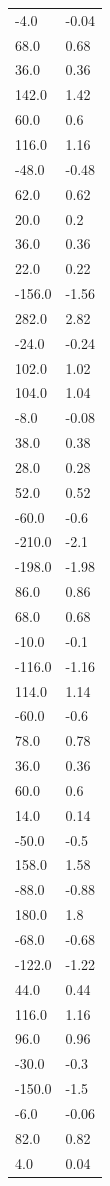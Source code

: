 \begin{longtable}{ll}
-4.0 & -0.04 \\
68.0 & 0.68 \\
36.0 & 0.36 \\
142.0 & 1.42 \\
60.0 & 0.6 \\
116.0 & 1.16 \\
-48.0 & -0.48 \\
62.0 & 0.62 \\
20.0 & 0.2 \\
36.0 & 0.36 \\
22.0 & 0.22 \\
-156.0 & -1.56 \\
282.0 & 2.82 \\
-24.0 & -0.24 \\
102.0 & 1.02 \\
104.0 & 1.04 \\
-8.0 & -0.08 \\
38.0 & 0.38 \\
28.0 & 0.28 \\
52.0 & 0.52 \\
-60.0 & -0.6 \\
-210.0 & -2.1 \\
-198.0 & -1.98 \\
86.0 & 0.86 \\
68.0 & 0.68 \\
-10.0 & -0.1 \\
-116.0 & -1.16 \\
114.0 & 1.14 \\
-60.0 & -0.6 \\
78.0 & 0.78 \\
36.0 & 0.36 \\
60.0 & 0.6 \\
14.0 & 0.14 \\
-50.0 & -0.5 \\
158.0 & 1.58 \\
-88.0 & -0.88 \\
180.0 & 1.8 \\
-68.0 & -0.68 \\
-122.0 & -1.22 \\
44.0 & 0.44 \\
116.0 & 1.16 \\
96.0 & 0.96 \\
-30.0 & -0.3 \\
-150.0 & -1.5 \\
-6.0 & -0.06 \\
82.0 & 0.82 \\
4.0 & 0.04 \\

\end{longtable}
